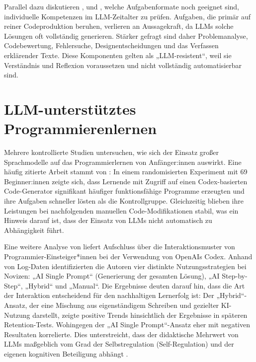 Parallel dazu diskutieren \textcite[S.~1]{DennyPromptProblems2024}, \textcite[S.~1]{MahonGuidelines} und \textcite[S.~108]{PratherRobotsAreHere2023}, welche Aufgabenformate noch geeignet sind, individuelle Kompetenzen im LLM-Zeitalter zu prüfen. Aufgaben, die primär auf reiner Codeproduktion beruhen, verlieren an Aussagekraft, da LLMs solche Lösungen oft vollständig generieren. Stärker gefragt sind daher Problemanalyse, Codebewertung, Fehlersuche, Designentscheidungen und das Verfassen erklärender Texte. Diese Komponenten gelten als „LLM-resistent“, weil sie Verständnis und Reflexion voraussetzen und nicht vollständig automatisierbar sind.


\section{LLM-unterstütztes Programmierenlernen}
Mehrere kontrollierte Studien untersuchen, wie sich der Einsatz großer Sprachmodelle auf das Programmierlernen von Anfänger:innen auswirkt. Eine häufig zitierte Arbeit stammt von \textcite[S.~11]{KazemitabaarSupportLearners2023}: In einem randomisierten Experiment mit 69 Beginner:innen zeigte sich, dass Lernende mit Zugriff auf einen Codex-basierten Code-Generator signifikant häufiger funktionsfähige Programme erzeugten und ihre Aufgaben schneller lösten als die Kontrollgruppe. Gleichzeitig blieben ihre Leistungen bei nachfolgenden manuellen Code-Modifikationen stabil, was ein Hinweis darauf ist, dass der Einsatz von LLMs nicht automatisch zu Abhängigkeit führt.

Eine weitere Analyse von \textcite[S.~1]{kazemitabaar_how_2023} liefert Aufschluss über die Interaktionsmuster von Programmier-Einsteiger*innen bei der Verwendung von OpenAIs Codex. Anhand von Log-Daten identifizierten die Autoren vier distinkte Nutzungsstrategien bei Novizen: „AI Single Prompt“ (Generierung der gesamten Lösung), „AI Step-by-Step“, „Hybrid“ und „Manual“. Die Ergebnisse deuten darauf hin, dass die Art der Interaktion entscheidend für den nachhaltigen Lernerfolg ist: Der „Hybrid“-Ansatz, der eine Mischung aus eigenständigem Schreiben und gezielter KI-Nutzung darstellt, zeigte positive Trends hinsichtlich der Ergebnisse in späteren Retention-Tests. Wohingegen der „AI Single Prompt“-Ansatz eher mit negativen Resultaten korrelierte. Dies unterstreicht, dass der didaktische Mehrwert von LLMs maßgeblich vom Grad der Selbstregulation (Self-Regulation) und der eigenen kognitiven Beteiligung abhängt \parencite[S.~12]{kazemitabaar_how_2023}.

